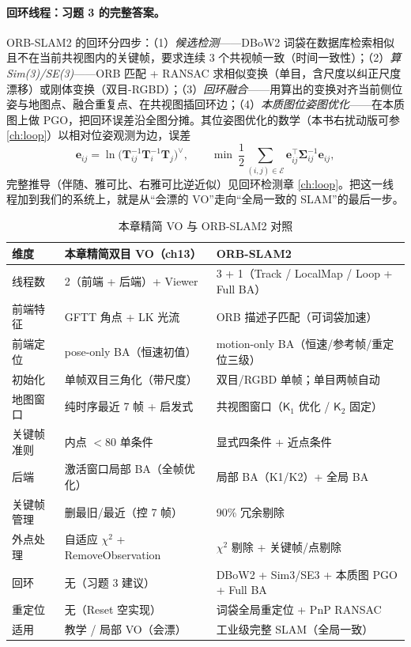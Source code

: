 \paragraph{回环线程：习题 3 的完整答案。}
ORB-SLAM2 的回环分四步：（1）\emph{候选检测}——DBoW2 词袋在数据库检索相似且不在当前共视图内的关键帧，要求连续 3 个共视帧一致（时间一致性）；（2）\emph{算 Sim(3)/SE(3)}——ORB 匹配 + RANSAC 求相似变换（单目，含尺度以纠正尺度漂移）或刚体变换（双目-RGBD）；（3）\emph{回环融合}——用算出的变换对齐当前侧位姿与地图点、融合重复点、在共视图插回环边；（4）\emph{本质图位姿图优化}——在本质图上做 PGO，把回环误差沿全图分摊。其位姿图优化的数学（本书右扰动版可参 \cref{ch:loop}）以相对位姿观测为边，误差
\begin{equation}
\mathbf{e}_{ij}=\ln\!\big(\mathbf{T}_{ij}^{-1}\mathbf{T}_i^{-1}\mathbf{T}_j\big)^\vee,\qquad
\min\ \frac12\sum_{(i,j)\in\mathcal{E}}\mathbf{e}_{ij}^\top\boldsymbol\Sigma_{ij}^{-1}\mathbf{e}_{ij},
\label{eq:sys-pgo}
\end{equation}
完整推导（伴随、雅可比、右雅可比逆近似）见回环检测章 \cref{ch:loop}。把这一线程加到我们的系统上，就是从“会漂的 VO”走向“全局一致的 SLAM”的最后一步。

\begin{table}[H]\centering\small
\caption{本章精简 VO 与 ORB-SLAM2 对照}
\label{tab:sys-orb-compare}
\begin{tabular}{lll}
\toprule
维度 & 本章精简双目 VO（ch13） & ORB-SLAM2 \\
\midrule
线程数 & 2（前端 + 后端）+ Viewer & 3 + 1（Track / LocalMap / Loop + Full BA） \\
前端特征 & GFTT 角点 + LK 光流 & ORB 描述子匹配（可词袋加速） \\
前端定位 & pose-only BA（恒速初值） & motion-only BA（恒速/参考帧/重定位三级） \\
初始化 & 单帧双目三角化（带尺度） & 双目/RGBD 单帧；单目两帧自动 \\
地图窗口 & 纯时序最近 7 帧 + 启发式 & 共视图窗口（$\mathsf{K}_1$ 优化 / $\mathsf{K}_2$ 固定） \\
关键帧准则 & 内点 $<80$ 单条件 & 显式四条件 + 近点条件 \\
后端 & 激活窗口局部 BA（全帧优化） & 局部 BA（K1/K2）+ 全局 BA \\
关键帧管理 & 删最旧/最近（控 7 帧） & 90\% 冗余剔除 \\
外点处理 & 自适应 $\chi^2$ + RemoveObservation & $\chi^2$ 剔除 + 关键帧/点剔除 \\
回环 & 无（习题 3 建议） & DBoW2 + Sim3/SE3 + 本质图 PGO + Full BA \\
重定位 & 无（Reset 空实现） & 词袋全局重定位 + PnP RANSAC \\
适用 & 教学 / 局部 VO（会漂） & 工业级完整 SLAM（全局一致） \\
\bottomrule
\end{tabular}
\end{table}

